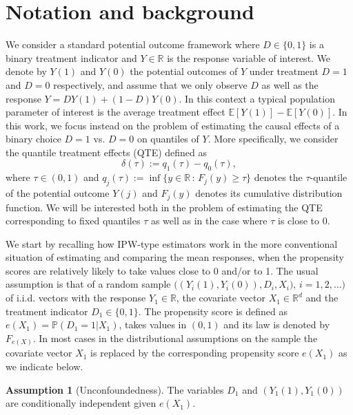 \documentclass[12pt]{amsart}
\newcommand{\LFe}{F_{e(X)}}
\newcommand{\1}{\mathbbm{1}}
\newcommand{\0}{\mathbf{0}}
\theoremstyle{plain}
\theoremstyle{definition}
\newtheorem{assumption}[theorem]{Assumption}
\newcommand{\bbP}{\mathbb{P}}
\begin{document}
\section{Notation and background}
\label{sec:notation} 

We consider a standard potential outcome framework where $D\in\{0,1\}$ is a binary treatment indicator and $Y\in\mathbb{R}$  is the response variable of interest.  We denote by $Y(1)$ and $Y(0)$ the potential outcomes of $Y$ under treatment $D=1$ and $D=0$ respectively, and assume that we only observe $D$ as well as the response $Y=DY(1)+(1-D)Y(0)$. In this context a typical population parameter of interest is the average treatment effect $\mathbb{E}[Y(1)]-\mathbb{E}[Y(0)]$. In this work, we
 focus instead on the problem  of estimating the causal effects of a binary choice $D=1$ vs. $D=0$ on quantiles of $Y$. More specifically, we consider the quantile treatment effects (QTE) defined as
 \begin{equation*}
     \label{eq:QTE}
     \delta(\tau):=q_1(\tau)-q_0(\tau),
 \end{equation*}
where $\tau\in(0,1)$ and $q_j(\tau):=\inf\{y\in \mathbb{R}\,:\,F_j(y)\geq\tau\}$ denotes the $\tau$-quantile of the potential outcome $Y(j)$ and $F_j(y)$ denotes its cumulative distribution function. We will be interested both in the problem of  estimating  the QTE corresponding to fixed quantiles $\tau$ as well as in the case where $\tau$ is close to $0$.

We start by recalling how IPW-type estimators work in the more conventional situation of estimating and comparing the mean responses, when the propensity scores are relatively likely to take values close to 0 and/or to 1.  
The usual assumption is that of a random sample $\bigl( (Y_i(1),Y_i(0)),
D_i, X_i), \, i=1,2,\ldots\bigr)$ of i.i.d. vectors with the response $Y_1\in\mathbb{R}$, the covariate vector $X_1\in\mathbb{R}^d$ and  the treatment indicator $D_1\in\{0,1\}$. The propensity score is defined as 
$e(X_1)=  \bbP(D_1=1|X_1)$, takes values in $(0,1)$ and its law is denoted by $\LFe$. In most cases in the distributional assumptions on the sample the covariate vector $X_1$ is replaced by the corresponding propensity score $e(X_1)$ as we indicate below. 
 
\begin{assumption}[Unconfoundedness]\label{ass:unconfoundedness}
    The variables $D_1$ and $(Y_1(1),Y_1(0))$ are conditionally independent
given $e(X_1)$. 
\end{assumption}
\end{document}
